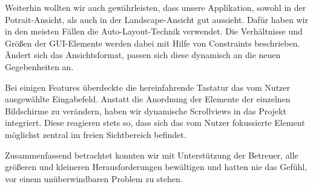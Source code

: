 	Weiterhin wollten wir auch gewährleisten, dass unsere Applikation, sowohl in der Potrait-Ansicht, als auch in der Landscape-Ansicht gut aussieht. Dafür haben wir in den meisten Fällen die Auto-Layout-Technik verwendet. Die Verhältnisse und Größen der GUI-Elemente werden dabei mit Hilfe von Constraints beschrieben. Ändert sich das Ansichtsformat, passen sich diese dynamisch an die neuen Gegebenheiten an.
	
	Bei einigen Features überdeckte die hereinfahrende Tastatur das vom Nutzer ausgewählte Eingabefeld. Anstatt die Anordnung der Elemente der einzelnen Bildschirme zu verändern, haben wir dynamische Scrollviews in das Projekt integriert. Diese reagieren stets so, dass sich das vom Nutzer fokussierte Element möglichst zentral im freien Sichtbereich befindet.

	Zusammenfassend betrachtet konnten wir mit Unterstützung der Betreuer, alle größeren und kleineren Herausforderungen bewältigen und hatten nie das Gefühl, vor einem unüberwindbaren Problem zu stehen.
	
	